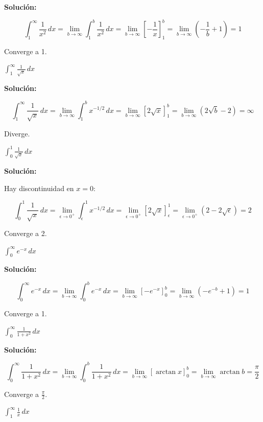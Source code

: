 \documentclass[12pt, a4paper]{book}
\begin{document}
\textbf{Solución:}

\[
\int_1^\infty \frac{1}{x^2} \, dx = \lim_{b \to \infty} \int_1^b \frac{1}{x^2} \, dx = \lim_{b \to \infty} [-\frac{1}{x}]_1^b = \lim_{b \to \infty} (-\frac{1}{b} + 1) = 1
\]

Converge a 1.

\begin{ejercicio}
$\int_1^\infty \frac{1}{\sqrt{x}} \, dx$
\end{ejercicio}

\textbf{Solución:}

\[
\int_1^\infty \frac{1}{\sqrt{x}} \, dx = \lim_{b \to \infty} \int_1^b x^{-1/2} \, dx = \lim_{b \to \infty} [2\sqrt{x}]_1^b = \lim_{b \to \infty} (2\sqrt{b} - 2) = \infty
\]

Diverge.

\begin{ejercicio}
$\int_0^1 \frac{1}{\sqrt{x}} \, dx$
\end{ejercicio}

\textbf{Solución:}

Hay discontinuidad en $x = 0$:

\[
\int_0^1 \frac{1}{\sqrt{x}} \, dx = \lim_{\epsilon \to 0^+} \int_\epsilon^1 x^{-1/2} \, dx = \lim_{\epsilon \to 0^+} [2\sqrt{x}]_\epsilon^1 = \lim_{\epsilon \to 0^+} (2 - 2\sqrt{\epsilon}) = 2
\]

Converge a 2.

\begin{ejercicio}
$\int_0^\infty e^{-x} \, dx$
\end{ejercicio}

\textbf{Solución:}

\[
\int_0^\infty e^{-x} \, dx = \lim_{b \to \infty} \int_0^b e^{-x} \, dx = \lim_{b \to \infty} [-e^{-x}]_0^b = \lim_{b \to \infty} (-e^{-b} + 1) = 1
\]

Converge a 1.

\begin{ejercicio}
$\int_0^\infty \frac{1}{1+x^2} \, dx$
\end{ejercicio}

\textbf{Solución:}

\[
\int_0^\infty \frac{1}{1+x^2} \, dx = \lim_{b \to \infty} \int_0^b \frac{1}{1+x^2} \, dx = \lim_{b \to \infty} [\arctan x]_0^b = \lim_{b \to \infty} \arctan b = \frac{\pi}{2}
\]

Converge a $\frac{\pi}{2}$.

\begin{ejercicio}
$\int_1^\infty \frac{1}{x} \, dx$
\end{ejercicio}
\end{document}

